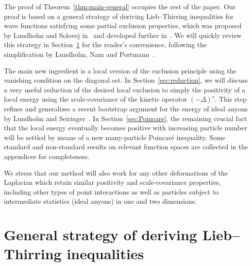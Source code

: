 \documentclass[AHL, Unicode, longabstracts, published]{cedram}
\newcommand\1{{\ensuremath {\mathds 1} }}
\begin{document}

The proof of Theorem~\ref{thm:main-general} occupies the rest of the paper. Our proof is based on a general strategy of deriving Lieb--Thirring inequalities for wave functions satisfying some partial exclusion properties, which was proposed by Lundholm and Solovej in~\cite{LunSol-13a} and developed further in~\cite{FraSei-12,LarLun-18,LunNamPor-16,LunPorSol-15,LunSol-13b,
LunSol-14,LunSei-18,Lundholm-18,Nam-18}. We will quickly review this strategy in Section~\ref{sec:general-strategy} for the reader's convenience, following the simplification by Lundholm, Nam and Portmann~\cite{LunNamPor-16}.

The main new ingredient is a local version of the exclusion principle using the vanishing condition on the diagonal set. In Section~\ref{sec:reduction}, we will discuss a very useful reduction of the desired local exclusion to simply the positivity of a local energy using the scale-covariance of the kinetic operator $(-\Delta)^s$. This step refines and generalizes a recent bootstrap argument for the energy of ideal anyons by Lundholm and Seiringer~\cite{LunSei-18}. In Section~\ref{sec:Poincare}, the remaining crucial fact that the local energy eventually becomes positive with increasing particle number will be settled by means of a new many-particle Poincaré inequality. Some standard and non-standard results on relevant function spaces are collected in the appendices for completeness.

We stress that our method will also work for any other deformations of the Laplacian which retain similar positivity and scale-covariance properties, including other types of point interactions as well as particles subject to intermediate statistics (ideal anyons) in one and two dimensions.



\section{General strategy of deriving Lieb--Thirring inequalities} \label{sec:general-strategy}
\end{document}
